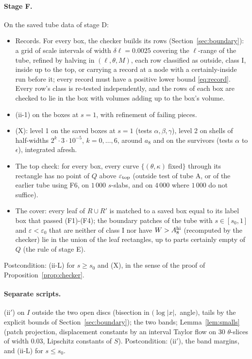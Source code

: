 \paragraph{Stage F.} On the saved tube data of stage D:
\begin{itemize}
\item[(F1)] Records. For every box, the checker builds its rows (Section~\ref{sec:boundary}): a grid of scale
intervals of width $\delta\ell=0.0025$ covering the $\ell$-range of the tube, refined by halving in $(\ell,\theta,M)$,
each row classified as outside, class I, inside up to the top, or carrying a record at a node with a certainly-inside
run before it; every record must have a positive lower bound \eqref{eq:record}. Every row's class is re-tested
independently, and the rows of each box are checked to lie in the box with volumes adding up to the box's volume.
\item[(F2)] (ii-1) on the boxes at $s=1$, with refinement of failing pieces.
\item[(F3)] (X): level 1 on the saved boxes at $s=1$ (tests $\alpha,\beta,\gamma$), level 2 on shells of half-widths
$2^k\cdot3\cdot10^{-5}$, $k=0,\dots,6$, around $a_8$ and on the survivors (tests $\alpha$ to $\epsilon$), integrated afresh.
\item[(F4)] The top check: for every box, every curve $\{(\theta,\kappa)\ \text{fixed}\}$ through its rectangle has no point
of $Q$ above $\varepsilon_{\rm top}$ (outside test of tube A, or of the earlier tube using F6, on $1\,000$ $s$-slabs, and
on $4\,000$ where $1\,000$ do not suffice).
\item[(F5)] The cover: every leaf of $R\cup R'$ is matched to a saved box equal to its label box that passed (F1)-(F4);
the boundary patches of the tube with $s\in[s_0,1]$ and $\varepsilon<\varepsilon_0$ that are neither of class I nor have
$W>A_8^{\rm hi}$ (recomputed by the checker) lie in the union of the leaf rectangles, up to parts certainly empty of
$Q$ (the rule of stage E).
\end{itemize}
Postcondition: (ii-L) for $s\ge s_0$ and (X), in the sense of the proof of Proposition~\ref{prop:checker}.

\paragraph{Separate scripts.} (ii$'$) on $I$ outside the two open discs (bisection in $(\log|x|,$ angle$)$, tails by the
explicit bounds of Section~\ref{sec:boundary}); the two bands; Lemma~\ref{lem:smalls} (patch projection, displacement
constants by an interval Taylor flow on 30 $\theta$-slices of width $0.03$, Lipschitz constants of $S$). Postcondition:
(ii$'$), the band margins, and (ii-L) for $s\le s_0$.

